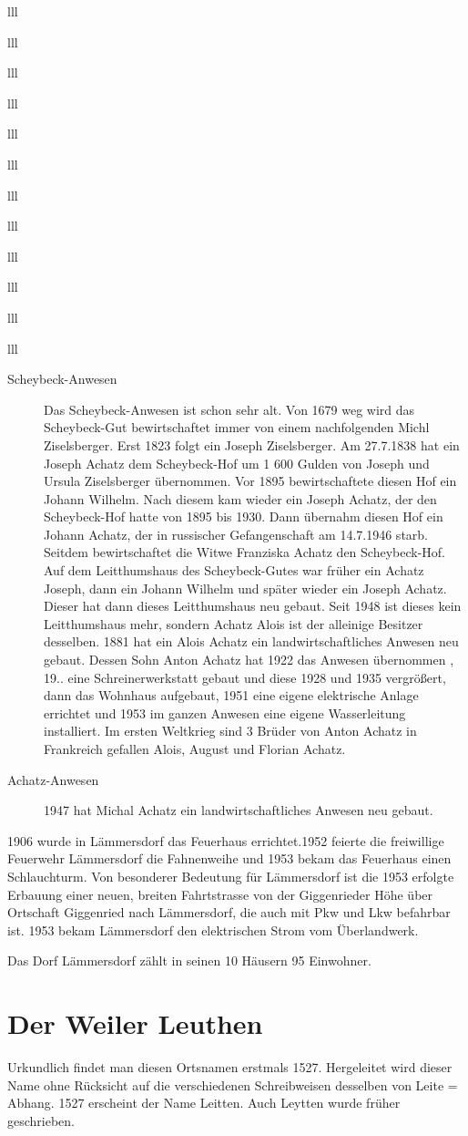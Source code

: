 \documentclass[12pt,a4pager]{book}
\begin{document}
\begin{tabuluar}{lll}
\begin{tabuluar}{lll}
\begin{tabuluar}{lll}
\begin{tabuluar}{lll}
\begin{tabuluar}{lll}
\begin{tabuluar}{lll}
\begin{tabuluar}{lll}
\begin{tabuluar}{lll}
\begin{tabuluar}{lll}
\begin{tabuluar}{lll}
\begin{tabuluar}{lll}
\begin{tabuluar}{lll}
\begin{description}
\item[Scheybeck-Anwesen] Das Scheybeck-Anwesen ist schon sehr alt. Von 1679 weg
wird das Scheybeck-Gut bewirtschaftet immer von einem nachfolgenden Michl
Ziselsberger. Erst 1823 folgt ein Joseph Ziselsberger. Am 27.7.1838 hat ein
Joseph Achatz dem Scheybeck-Hof um 1 600 Gulden von Joseph und Ursula
Ziselsberger übernommen. Vor 1895 bewirtschaftete diesen Hof ein Johann Wilhelm.
Nach diesem kam wieder ein Joseph Achatz, der den Scheybeck-Hof hatte von 1895
bis 1930. Dann übernahm diesen Hof ein Johann Achatz, der in russischer
Gefangenschaft am 14.7.1946 starb. Seitdem bewirtschaftet die Witwe Franziska
Achatz den Scheybeck-Hof. Auf dem Leitthumshaus des Scheybeck-Gutes war früher
ein Achatz Joseph, dann ein Johann Wilhelm und später wieder ein Joseph Achatz.
Dieser hat dann dieses Leitthumshaus neu gebaut. Seit 1948 ist dieses kein
Leitthumshaus mehr, sondern Achatz Alois ist der alleinige Besitzer desselben.
1881 hat ein Alois Achatz ein landwirtschaftliches Anwesen neu gebaut. Dessen
Sohn Anton Achatz hat 1922 das Anwesen übernommen , 19.. eine Schreinerwerkstatt
gebaut und diese 1928 und 1935 vergrößert, dann das Wohnhaus aufgebaut, 1951
eine eigene elektrische Anlage errichtet und 1953 im ganzen Anwesen eine eigene
Wasserleitung installiert. Im ersten Weltkrieg sind 3 Brüder von Anton Achatz in
Frankreich gefallen Alois, August und Florian Achatz.

\item[Achatz-Anwesen] 1947 hat Michal Achatz ein landwirtschaftliches Anwesen
neu gebaut.
\end{description}

1906 wurde in Lämmersdorf das Feuerhaus errichtet.1952 feierte die freiwillige
Feuerwehr Lämmersdorf die Fahnenweihe und 1953 bekam das Feuerhaus einen
Schlauchturm. Von besonderer Bedeutung für Lämmersdorf ist die 1953 erfolgte
Erbauung einer neuen, breiten Fahrtstrasse von der Giggenrieder Höhe über
Ortschaft Giggenried nach Lämmersdorf, die auch mit Pkw und Lkw befahrbar ist.
1953 bekam Lämmersdorf den elektrischen Strom vom Überlandwerk.

Das Dorf Lämmersdorf zählt in seinen 10 Häusern 95 Einwohner.

\section{Der Weiler Leuthen}

Urkundlich findet man diesen Ortsnamen erstmals 1527. Hergeleitet wird dieser
Name ohne Rücksicht auf die verschiedenen Schreibweisen desselben von Leite =
Abhang. 1527 erscheint der Name Leitten. Auch Leytten wurde früher geschrieben.


\end{tabuluar}
\end{tabuluar}
\end{tabuluar}
\end{tabuluar}
\end{tabuluar}
\end{tabuluar}
\end{tabuluar}
\end{tabuluar}
\end{tabuluar}
\end{tabuluar}
\end{tabuluar}
\end{tabuluar}
\end{document}
